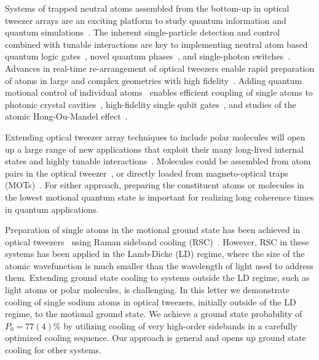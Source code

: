 \documentclass[aps,prl,twocolumn,groupedaddress]{revtex4-1}
\begin{document}
Systems of trapped neutral atoms assembled from the bottom-up in optical tweezer arrays
are an exciting platform to study quantum information and quantum simulations~\cite{Schlosser2001,Weiss2004,Isenhower2010,Wilk2010,Kaufman2015,Labuhn2016,Murmann2015}.
The inherent single-particle detection and control combined with tunable interactions
are key to implementing neutral atom based quantum logic gates~\cite{Isenhower2010,Wilk2010},
novel quantum phases~\cite{Labuhn2016}, and single-photon switches~\cite{Dayan2008,Tiecke2014}.
Advances in real-time re-arrangement of optical tweezers enable rapid preparation of atoms
in large and complex geometries with high fidelity~\cite{Barredo2016,Endres2016}.
Adding quantum motional control of individual
atoms~\cite{Li2012,Kaufman2012,Thompson2013,Liu2017,Robens2017} enables
efficient coupling of single atoms to photonic crystal cavities~\cite{Thompson2013a},
high-fidelity single qubit gates~\cite{Wang2016},
and studies of the atomic Hong-Ou-Mandel effect~\cite{Kaufman2014}.

Extending optical tweezer array techniques to include polar molecules will open up a large range of
new applications that exploit their many long-lived internal states
and highly tunable interactions~\cite{DeMille2002,Ni2008,Gorshkov2011,Yan2013}.
Molecules could be assembled from atom pairs in the optical tweezer~\cite{Liu2017},
or directly loaded from magneto-optical traps
(MOTs)~\cite{Barry2014,Truppe2017SubDoppler,Anderegg2017}.
For either approach, preparing the constituent atoms or molecules in the lowest motional
quantum state is important for realizing long coherence times in quantum applications.

Preparation of single atoms in the motional ground state has been achieved in optical tweezers~\cite{Kaufman2012,Thompson2013,Liu2017,Robens2017}
 using Raman sideband cooling (RSC)~\cite{Monroe1995,Kerman2000,Han2000}.
However, RSC in these systems has been applied in the Lamb-Dicke (LD) regime, where
the size of the atomic wavefunction is much smaller than the wavelength of light used to address them.
Extending ground state cooling to systems outside the LD regime, such as light atoms or polar molecules, is challenging.
In this letter we demonstrate cooling of single sodium atoms in optical tweezers, initially outside of the LD regime, to the motional ground state.
We achieve a ground state probability of $P_0=77(4)$\% by utilizing cooling of
very high-order sidebands in a carefully optimized cooling sequence.
Our approach is general and opens up ground state cooling for other systems.
\end{document}
